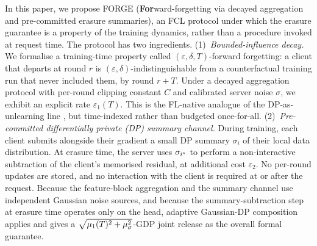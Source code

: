 In this paper, we propose FORGE (\textbf{For}ward-forgetting via decayed aggregation and
pre-committed erasure summaries), an FCL protocol under which the erasure guarantee is a
property of the training dynamics, rather than a procedure invoked at request time. The
protocol has two ingredients. (1)~\emph{Bounded-influence decay.} We formalise a
training-time property called $(\varepsilon, \delta, T)$-forward forgetting: a client
that departs at round $r$ is $(\varepsilon, \delta)$-indistinguishable from a
counterfactual training run that never included them, by round $r + T$. Under a decayed
aggregation protocol with per-round clipping constant $C$ and calibrated server noise
$\sigma$, we exhibit an explicit rate $\varepsilon_1(T)$. This is the FL-native analogue
of the DP-as-unlearning line \cite{guo2020certified,sekhari2021remember,neel2021descent},
but time-indexed rather than budgeted once-for-all. (2)~\emph{Pre-committed differentially
private (DP) summary channel.} During training, each client submits alongside their
gradient a small DP summary $\sigma_i$ of their local data distribution. At erasure time,
the server uses $\sigma_{i^{\star}}$ to perform a non-interactive subtraction of the
client's memorised residual, at additional cost $\varepsilon_2$. No per-round updates
are stored, and no interaction with the client is required at or after the request.
Because the feature-block aggregation and the summary channel use independent Gaussian
noise sources, and because the summary-subtraction step at erasure time operates only
on the head, adaptive Gaussian-DP composition applies and gives a
$\sqrt{\mu_1(T)^2 + \mu_\sigma^2}$-GDP joint release as the overall formal guarantee.

